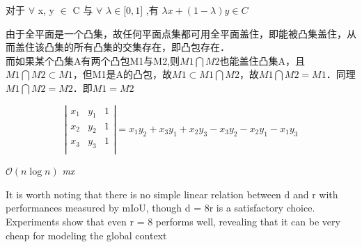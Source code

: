 \documentclass{article}
\begin{document}
对于 $\forall$ x, y $\in$ C 与 $\forall$  $\lambda\in \lbrack 0, 1 \rbrack $ ,有
$\lambda x + (1-\lambda)y \in C$


由于全平面是一个凸集，故任何平面点集都可用全平面盖住，即能被凸集盖住，从而盖住该凸集的所有凸集的交集存在，即凸包存在． \\

而如果某个凸集A有两个凸包M1与M2,则$M1 \bigcap M2$也能盖住凸集A，且$M1 \bigcap M2 \subset M1$，但M1是A的凸包，故$ M1 \subset M1 \bigcap M2$，故$M1 \bigcap M2 = M1$．同理$M1 \bigcap M2 = M2$．即$M1 = M2$


$$
\left|
\begin{matrix}
x_1 & y_1 & 1 \\
x_2 & y_2 & 1 \\
x_3 & y_3 & 1 \\
\end{matrix}
\right| = x_1y_2+x_3y_1+x_2y_3-x_3y_2-x_2y_1-x_1y_3
$$

$\mathcal{O}(n\log{}n)$
\emph{mx}

It is worth noting that there is no simple linear relation between d and r with performances measured by mIoU, though d = 8r is a satisfactory choice. Experiments show that even r = 8 performs well, revealing that it can be very cheap for modeling the global context
\end{document}
